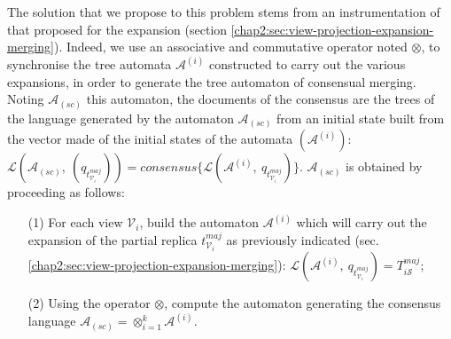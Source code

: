 The solution that we propose to this problem stems from an instrumentation of that proposed for the expansion (section \ref{chap2:sec:view-projection-expansion-merging}). 
Indeed, we use an associative and commutative operator noted $\otimes$, to synchronise the tree automata $\mathcal{A}^{(i)}$ constructed to carry out the various expansions, in order to generate the tree automaton of consensual merging. Noting $\mathcal{A}_{(sc)}$ this automaton, the documents of the consensus are the trees of the language generated by the automaton $\mathcal{A}_{(sc)}$ from an initial state built from the vector made of the initial states of the automata $(\mathcal{A}^{(i)})$: 
$\mathscr{L}(\mathcal{A}_{(sc)},~(q_{t_{\mathcal{V}_i}^{maj}})) = consensus  \{\mathscr{L}(\mathcal{A}^{(i)},~q_{t_{\mathcal{V}_i}^{maj}})\}$.	
$\mathcal{A}_{(sc)}$ is obtained by proceeding as follows:
\begin{itemize}
	\item[(1)] For each view $\mathcal{V}_i$, build the automaton $\mathcal{A}^{(i)}$ which will carry out the expansion of the partial replica $t_{\mathcal{V}_i}^{maj}$ as previously indicated (sec. \ref{chap2:sec:view-projection-expansion-merging}): $  \mathscr{L}\left(\mathcal{A}^{(i)},~q_{t_{\mathcal{V}_i}^{maj}}\right) = T_{i\mathcal{S}}^{maj}$;
	\item[(2)] Using the operator $\otimes$, compute the automaton generating the consensus language $\mathcal{A}_{(sc)}=\otimes_{i=1}^{k}\mathcal{A}^{(i)}$. 
\end{itemize}




